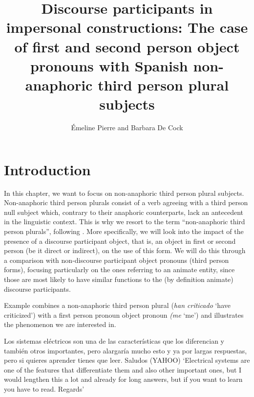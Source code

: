 \documentclass[output=paper]{langscibook}
\author{Émeline Pierre\orcid{0000-0003-0073-9633}\affiliation{Université catholique de Louvain} and Barbara {De Cock}\orcid{0000-0001-6968-3880}\affiliation{Université catholique de Louvain}}
\title[Discourse participants in impersonal constructions]
	  {Discourse participants in impersonal constructions: The case of first and second person object pronouns with Spanish non-anaphoric third person plural subjects}
\begin{document}
\maketitle 

\section{Introduction}

In this chapter, we want to focus on non-anaphoric third person plural subjects. Non-anaphoric third person plurals consist of a verb agreeing with a third person null subject which, contrary to their anaphoric counterparts, lack an antecedent in the linguistic context. This is why we resort to the term “non-anaphoric third person plurals”, following \citet{CabredoHofherr2006}. More specifically, we will look into the impact of the presence of a discourse participant object, that is, an object in first or second person (be it direct or indirect), on the use of this form. We will do this through a comparison with non-discourse participant object pronouns (third person forms), focusing particularly on the ones referring to an animate entity, since those are most likely to have similar functions to the (by definition animate) discourse participants. 


Example  combines a non-anaphoric third person plural (\textit{han criticado} ‘have criticized’) with a first person pronoun object pronoun \textit{(me} ‘me’) and illustrates the phenomenon we are interested in. 


\ea\label{ex:pierre:1}
Los sistemas eléctricos son una de las características que los diferencian y también otros importantes, pero alargaría mucho esto y ya  por largas respuestas, pero si quieres aprender tienes que leer. Saludos (YAHOO)
\glt ‘Electrical systems are one of the features that differentiate them and also other important ones, but I would lengthen this a lot and  already    for long answers, but if you want to learn you have to read. Regards’
\z 
\end{document}
